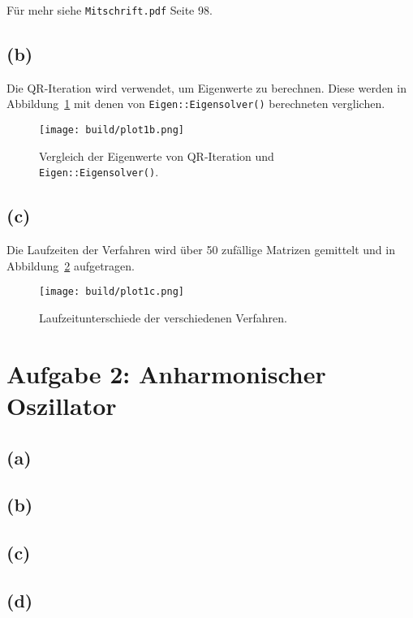 \documentclass{scrartcl}
\begin{document}
Für mehr siehe \texttt{Mitschrift.pdf} Seite 98.


\subsection*{(b)}
Die QR-Iteration wird verwendet, um Eigenwerte zu berechnen.
Diese werden in Abbildung~\ref{fig:1b} mit denen von \texttt{Eigen::Eigensolver()} berechneten verglichen.
\begin{figure}[ht]
  \centering
  \texttt{[image: build/plot1b.png]}
  \caption{Vergleich der Eigenwerte von QR-Iteration und \texttt{Eigen::Eigensolver()}.}%
  \label{fig:1b}
\end{figure}

\subsection*{(c)}
Die Laufzeiten der Verfahren wird über 50 zufällige Matrizen gemittelt und in Abbildung~\ref{fig:1c} aufgetragen.
\begin{figure}[ht]
  \centering
  \texttt{[image: build/plot1c.png]}
  \caption{Laufzeitunterschiede der verschiedenen Verfahren.}%
  \label{fig:1c}
\end{figure}

\section*{Aufgabe 2: Anharmonischer Oszillator}
\subsection*{(a)}
\subsection*{(b)}
\subsection*{(c)}
\subsection*{(d)}
\end{document}
